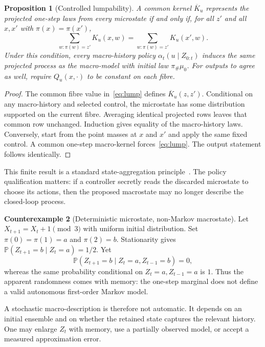 \documentclass[11pt,letterpaper]{article}
\theoremstyle{plain}
\newtheorem{proposition}{Proposition}[section]
\theoremstyle{definition}
\newtheorem{counterexample}[proposition]{Counterexample}
\theoremstyle{remark}
\newcommand{\Prob}{\mathbb P}
\newcommand{\push}{\pi_{\#}}
\begin{document}
\begin{proposition}[Controlled lumpability]\label{prop:lump}
A common kernel $\overline K_u$ represents the projected one-step laws from every microstate if and only if, for all $z'$ and all $x,x'$ with $\pi(x)=\pi(x')$,
\begin{equation}\label{eq:lump}
\sum_{w:\pi(w)=z'}K_u(x,w)
=\sum_{w:\pi(w)=z'}K_u(x',w).
\end{equation}
Under this condition, every macro-history policy $\alpha_t(u\mid Z_{0:t})$ induces the same projected process as the macro-model with initial law $\push\mu_0$. For outputs to agree as well, require $Q_u(x,\cdot)$ to be constant on each fibre.
\end{proposition}
\begin{proof}
The common fibre value in~\eqref{eq:lump} defines $\overline K_u(z,z')$. Conditional on any macro-history and selected control, the microstate has some distribution supported on the current fibre. Averaging identical projected rows leaves that common row unchanged. Induction gives equality of the macro-history laws. Conversely, start from the point masses at $x$ and $x'$ and apply the same fixed control. A common one-step macro-kernel forces~\eqref{eq:lump}. The output statement follows identically.
\end{proof}

This finite result is a standard state-aggregation principle~\cite{givan}. The policy qualification matters: if a controller secretly reads the discarded microstate to choose its actions, then the proposed macrostate may no longer describe the closed-loop process.

\begin{counterexample}[Deterministic microstate, non-Markov macrostate]\label{ex:cycle}
Let $X_{t+1}=X_t+1\pmod 3$ with uniform initial distribution. Set $\pi(0)=\pi(1)=a$ and $\pi(2)=b$. Stationarity gives $\Prob(Z_{t+1}=b\mid Z_t=a)=1/2$. Yet
\[
\Prob(Z_{t+1}=b\mid Z_t=a,Z_{t-1}=b)=0,
\]
whereas the same probability conditional on $Z_t=a,Z_{t-1}=a$ is $1$. Thus the apparent randomness comes with memory: the one-step marginal does not define a valid autonomous first-order Markov model.
\end{counterexample}

A stochastic macro-description is therefore not automatic. It depends on an initial ensemble and on whether the retained state captures the relevant history. One may enlarge $Z_t$ with memory, use a partially observed model, or accept a measured approximation error.
\end{document}
